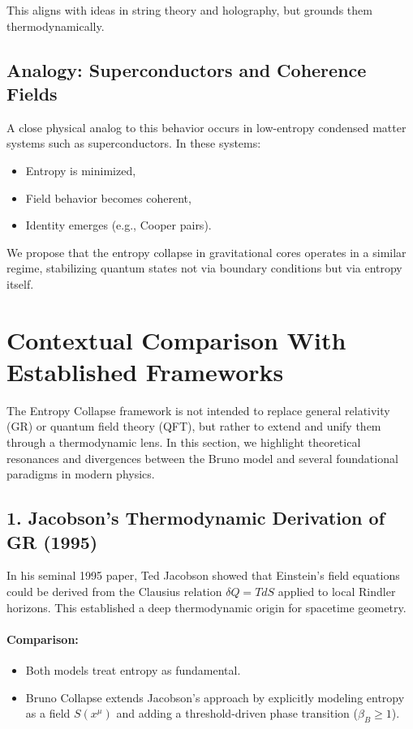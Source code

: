 \documentclass[12pt]{article}
\begin{document}
\FloatBarrier
This aligns with ideas in string theory and holography, but grounds them thermodynamically.

\clearpage
\subsection*{Analogy: Superconductors and Coherence Fields}

A close physical analog to this behavior occurs in low-entropy condensed matter systems such as superconductors. In these systems:
\begin{itemize}
  \item Entropy is minimized,
  \item Field behavior becomes coherent,
  \item Identity emerges (e.g., Cooper pairs).
\FloatBarrier
\end{itemize}

We propose that the entropy collapse in gravitational cores operates in a similar regime, stabilizing quantum states not via boundary conditions but via entropy itself.

\clearpage
\section{Contextual Comparison With Established Frameworks}

The Entropy Collapse framework is not intended to replace general relativity (GR) or quantum field theory (QFT), but rather to extend and unify them through a thermodynamic lens. In this section, we highlight theoretical resonances and divergences between the Bruno model and several foundational paradigms in modern physics.

\clearpage
\subsection*{1. Jacobson's Thermodynamic Derivation of GR (1995)}

In his seminal 1995 paper, Ted Jacobson showed that Einstein’s field equations could be derived from the Clausius relation $\delta Q = T dS$ applied to local Rindler horizons. This established a deep thermodynamic origin for spacetime geometry.

\paragraph{Comparison:}
\begin{itemize}
  \item Both models treat entropy as fundamental.
  \item Bruno Collapse extends Jacobson’s approach by explicitly modeling entropy as a field $S(x^\mu)$ and adding a threshold-driven phase transition ($\beta_B \geq 1$).
\end{itemize}
\end{document}

